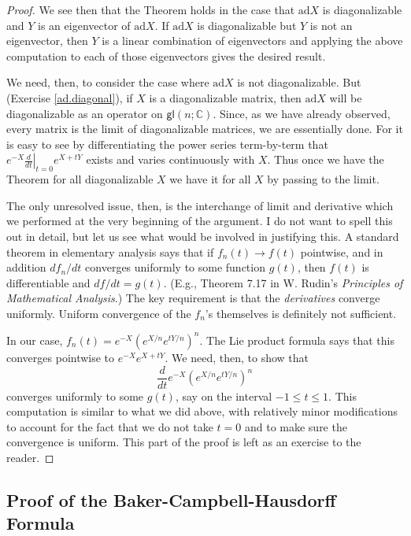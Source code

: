 \documentclass[12pt]{amsbook}
\theoremstyle{plain}
\numberwithin{equation}{chapter}
\numberwithin{theorem}{chapter}
\begin{document}
\begin{proof}
We see then that the Theorem holds in the case that $\mathrm{ad}X$ is
diagonalizable and $Y$ is an eigenvector of $\mathrm{ad}X$. If $\mathrm{ad}X$
is diagonalizable but $Y$ is not an eigenvector, then $Y$ is a linear
combination of eigenvectors and applying the above computation to each of
those eigenvectors gives the desired result.

We need, then, to consider the case where $\mathrm{ad}X$ is not
diagonalizable. But (Exercise \ref{ad.diagonal}), if $X$ is a diagonalizable
matrix, then $\mathrm{ad}X$ will be diagonalizable as an operator on
$\mathsf{gl}(n;\mathbb{C})$. Since, as we have already observed, every matrix
is the limit of diagonalizable matrices, we are essentially done. For it is
easy to see by differentiating the power series term-by-term that
$e^{-X}\left.  \tfrac{d}{dt}\right|  _{t=0}e^{X+tY}$ exists and varies
continuously with $X$. Thus once we have the Theorem for all diagonalizable
$X$ we have it for all $X$ by passing to the limit.

The only unresolved issue, then, is the interchange of limit and derivative
which we performed at the very beginning of the argument. I do not want to
spell this out in detail, but let us see what would be involved in justifying
this. A standard theorem in elementary analysis says that if $f_{n}%
(t)\rightarrow f(t)$ pointwise, and in addition $df_{n}/dt$ converges
uniformly to some function $g(t)$, then $f(t)$ is differentiable and
$df/dt=g(t)$. (E.g., Theorem 7.17 in W. Rudin's \textit{Principles of
Mathematical Analysis}.) The key requirement is that the \textit{derivatives}
converge uniformly. Uniform convergence of the $f_{n}$'s themselves is
definitely not sufficient.

In our case, $f_{n}(t)=e^{-X}\left(  e^{X/n}e^{tY/n}\right)  ^{n}$. The Lie
product formula says that this converges pointwise to $e^{-X}e^{X+tY}$. We
need, then, to show that
\[
\frac{d}{dt}e^{-X}\left(  e^{X/n}e^{tY/n}\right)  ^{n}%
\]
converges uniformly to some $g(t)$, say on the interval $-1\leq t\leq1$. This
computation is similar to what we did above, with relatively minor
modifications to account for the fact that we do not take $t=0$ and to make
sure the convergence is uniform. This part of the proof is left as an exercise
to the reader.
\end{proof}

\subsection{Proof of the Baker-Campbell-Hausdorff Formula}
\end{document}
